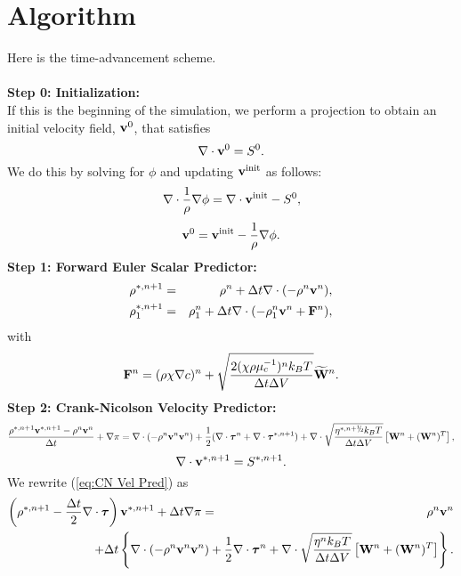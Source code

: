 \documentclass[final]{siamltex}
\newcommand{\sfrac}[2]{\mathchoice
  {\kern0em\raise.5ex\hbox{\the\scriptfont0 #1}\kern-.15em/
   \kern-.15em\lower.25ex\hbox{\the\scriptfont0 #2}}
  {\kern0em\raise.5ex\hbox{\the\scriptfont0 #1}\kern-.15em/
   \kern-.15em\lower.25ex\hbox{\the\scriptfont0 #2}}
  {\kern0em\raise.5ex\hbox{\the\scriptscriptfont0 #1}\kern-.2em/
   \kern-.15em\lower.25ex\hbox{\the\scriptscriptfont0 #2}}
  {#1\!/#2}}
\def\Fb {{\bf F}}
\def\vb {{\bf v}}
\def\Wb {{\bf W}}
\def\taub {\boldsymbol{\tau}}
\def\half   {\frac{1}{2}}
\def\myhalf {\sfrac{1}{2}}
\begin{document}
\section{Algorithm}
Here is the time-advancement scheme.\\ \\
{\bf Step 0: Initialization:}\\

If this is the beginning of the simulation, we perform a projection to obtain an initial 
velocity field, $\vb^0$, that satisfies
\begin{equation}
\nabla\cdot\vb^0 = S^0.
\end{equation}
We do this by solving for $\phi$ and updating $\vb^{\rm init}$ as follows:
\begin{equation}
\nabla\cdot\frac{1}{\rho}\nabla\phi = \nabla\cdot\vb^{\rm init} - S^0,
\end{equation}
\begin{equation}
\vb^0 = \vb^{\rm init} - \frac{1}{\rho}\nabla\phi.
\end{equation}
{\bf Step 1: Forward Euler Scalar Predictor:}
\begin{eqnarray}
\rho^{*,n+1} &=& \rho^n + \Delta t\nabla\cdot(-\rho^n\vb^n),\\
\rho_1^{*,n+1} &=& \rho_1^n + \Delta t\nabla\cdot(-\rho_1^n\vb^n + \Fb^n),
\end{eqnarray}
with
\begin{equation}
\Fb^n = (\rho\chi\nabla c)^n + \sqrt{\frac{2(\chi\rho\mu_c^{-1})^nk_BT}{\Delta t\Delta V}}\widetilde\Wb^n.
\end{equation}
{\bf Step 2: Crank-Nicolson Velocity Predictor:}
\begin{equation}
\frac{\rho^{*,n+1}\vb^{*,n+1} - \rho^n\vb^n}{\Delta t} + \nabla\pi = \nabla\cdot(-\rho^n\vb^n\vb^n) + \half(\nabla\cdot\taub^n + \nabla\cdot\taub^{*,n+1}) + \nabla\cdot\sqrt{\frac{\eta^{*,n+\myhalf} k_B T}{\Delta t\Delta V}}\left[\Wb^n + (\Wb^n)^T\right],\label{eq:CN Vel Pred}
\end{equation}
\begin{equation}
\nabla\cdot\vb^{*,n+1} = S^{*,n+1}.
\end{equation}
We rewrite (\ref{eq:CN Vel Pred}) as
\begin{eqnarray}
\left(\rho^{*,n+1} - \frac{\Delta t}{2}\nabla\cdot\taub\right)\vb^{*,n+1} + \Delta t\nabla\pi &=& \rho^n\vb^n\nonumber\\
&&\hspace{-1.5in}+ \Delta t\left\{\nabla\cdot(-\rho^n\vb^n\vb^n) + \half\nabla\cdot\taub^n + \nabla\cdot\sqrt{\frac{\eta^n k_B T}{\Delta t\Delta V}}\left[\Wb^n + (\Wb^n)^T\right]\right\}.\label{eq:CN Vel Pred2}
\end{eqnarray}
\end{document}
